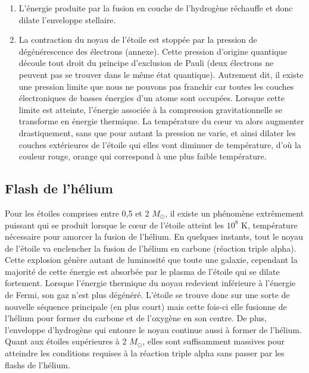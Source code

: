 \begin{enumerate}
	\item L’énergie produite par la fusion en couche de l’hydrogène réchauffe et donc dilate l’enveloppe stellaire.
	\item La contraction du noyau de l’étoile est stoppée par la pression de dégénérescence des électrons (annexe). Cette pression d’origine quantique découle tout droit du principe d’exclusion de Pauli (deux électrons ne peuvent pas se trouver dans le même état quantique). Autrement dit, il existe une pression limite que nous ne pouvons pas franchir car toutes les couches électroniques de basses énergies d’un atome sont occupées. Lorsque cette limite est atteinte, l’énergie associée à la compression gravitationnelle se transforme en énergie thermique. La température du cœur va alors augmenter drastiquement, sans que pour autant la pression ne varie, et ainsi dilater les couches extérieures de l’étoile qui elles vont diminuer de température, d’où la couleur rouge, orange qui correspond à une plus faible température. 
	
\end{enumerate}\bigskip

\subsection{Flash de l'hélium}\medskip

Pour les étoiles comprises entre 0,5 et 2 $M_\odot$, il existe un phénomène extrêmement puissant qui se produit lorsque le cœur de l’étoile atteint les $10^{8}$ K, température nécessaire pour amorcer la fusion de l’hélium. En quelques instants, tout le noyau de l’étoile va enclencher la fusion de l’hélium en carbone (réaction triple alpha). Cette explosion génère autant de luminosité que toute une galaxie, cependant la majorité de cette énergie est absorbée par le plasma de l’étoile qui se dilate fortement. Lorsque l’énergie thermique du noyau redevient inférieure à l’énergie de Fermi, son gaz n’est plus dégénéré. L’étoile se trouve donc sur une sorte de nouvelle séquence principale (en plus court) mais cette fois-ci elle fusionne de l’hélium pour former du carbone et de l’oxygène en son centre. De plus, l’enveloppe d’hydrogène qui entoure le noyau continue aussi à former de l’hélium.\newline \\ Quant aux étoiles supérieures à 2 $M_\odot$, elles sont suffisamment massives pour atteindre les conditions requises à la réaction triple alpha sans passer par les flashs de l’hélium.\newpage

